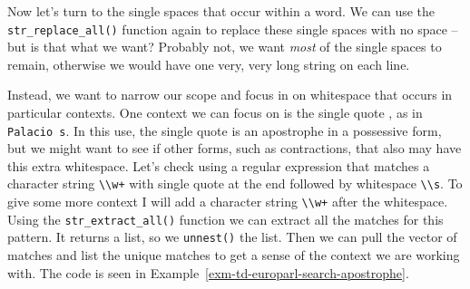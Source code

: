 \documentclass[
  letterpaper,
  DIV=11,
  numbers=noendperiod]{scrreport}
\theoremstyle{definition}
\theoremstyle{remark}
\begin{document}
Now let's turn to the single spaces that occur within a word. We can use
the \texttt{str\_replace\_all()} function again to replace these single
spaces with no space --but is that what we want? Probably not, we want
\emph{most} of the single spaces to remain, otherwise we would have one
very, very long string on each line.

Instead, we want to narrow our scope and focus in on whitespace that
occurs in particular contexts. One context we can focus on is the single
quote \texttt{\textquotesingle{}}, as in
\texttt{Palacio\textquotesingle{}\ s}. In this use, the single quote is
an apostrophe in a possessive form, but we might want to see if other
forms, such as contractions, that also may have this extra whitespace.
Let's check using a regular expression that matches a character string
\texttt{\textbackslash{}\textbackslash{}w+} with single quote
\texttt{\textquotesingle{}} at the end followed by whitespace
\texttt{\textbackslash{}\textbackslash{}s}. To give some more context I
will add a character string \texttt{\textbackslash{}\textbackslash{}w+}
after the whitespace. Using the \texttt{str\_extract\_all()} function we
can extract all the matches for this pattern. It returns a list, so we
\texttt{unnest()} the list. Then we can pull the vector of matches and
list the unique matches to get a sense of the context we are working
with. The code is seen in
Example~\ref{exm-td-europarl-search-apostrophe}.
\end{document}
